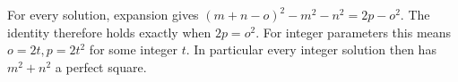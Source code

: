 For every solution, expansion gives $(m+n-o)^2-m^2-n^2=2p-o^2$. The identity therefore holds exactly when $2p=o^2$. For integer parameters this means $o=2t,p=2t^2$ for some integer $t$. In particular every integer solution then has $m^2+n^2$ a perfect square.
